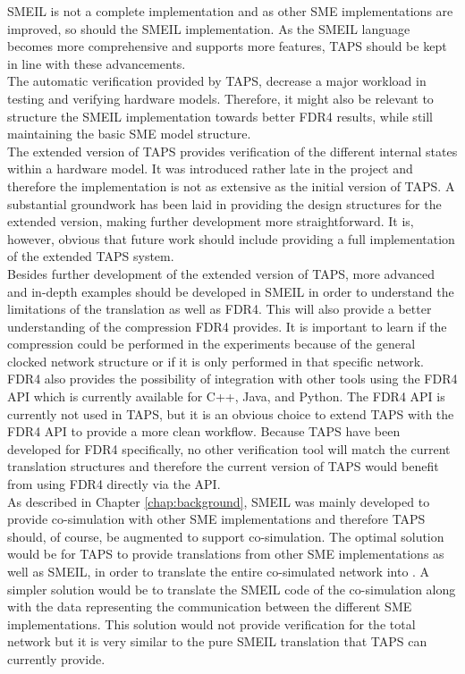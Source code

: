 
SMEIL is not a complete implementation and as other SME implementations are improved, so should the SMEIL implementation. As the SMEIL language becomes more comprehensive and supports more features, TAPS should be kept in line with these advancements.\\
The automatic verification provided by TAPS, decrease a major workload in testing and verifying hardware models. Therefore, it might also be relevant to structure the SMEIL implementation towards better FDR4 results, while still maintaining the basic SME model structure. \\

The extended version of TAPS provides verification of the different internal states within a hardware model. It was introduced rather late in the project and therefore the implementation is not as extensive as the initial version of TAPS. A substantial groundwork has been laid in providing the design structures for the extended version, making further development more straightforward. It is, however, obvious that future work should include providing a full implementation of the extended TAPS system. \\

Besides further development of the extended version of TAPS, more advanced and in-depth examples should be developed in SMEIL in order to understand the limitations of the translation as well as FDR4. This will also provide a better understanding of the compression FDR4 provides. It is important to learn if the compression could be performed in the experiments because of the general clocked network structure or if it is only performed in that specific network. \\

FDR4 also provides the possibility of integration with other tools using the FDR4 API which is currently available for C++, Java, and Python. The FDR4 API is currently not used in TAPS, but it is an obvious choice to extend TAPS with the FDR4 API to provide a more clean workflow. Because TAPS have been developed for FDR4 specifically, no other verification tool will match the current translation structures and therefore the current version of TAPS would benefit from using FDR4 directly via the API.\\

As described in Chapter \ref{chap:background}, SMEIL was mainly developed to provide co-simulation with other SME implementations and therefore TAPS should, of course, be augmented to support co-simulation. The optimal solution would be for TAPS to provide translations from other SME implementations as well as SMEIL, in order to translate the entire co-simulated network into \cspm{}. A simpler solution would be to translate the SMEIL code of the co-simulation along with the data representing the communication between the different SME implementations. This solution would not provide verification for the total network but it is very similar to the pure SMEIL translation that TAPS can currently provide.\\


